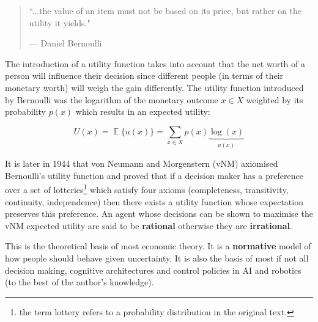 \begin{quote}
  \onehalfspacing%
  ``...the value of an item must not be based on its price, but rather on the utility it yields."\par\raggedleft--- \textup{Daniel Bernoulli}
\end{quote}

The introduction of a utility function takes into account that the net worth of a person will influence their decision since 
different people (in terms of their monetary worth) will weigh the gain differently. The utility function introduced by Bernoulli 
was the logarithm of the monetary outcome $x \in X$ weighted by its probability $p(x)$ which results in an expected utility: 

\begin{equation*}\label{eq:exp_utility}
  U(x) = \displaystyle \mathop{\mathbb{E}} \{ u(x) \} = \sum_{x\in X} p(x) \underbrace{\log(x)}_{u(x)}
\end{equation*}


It is later in 1944 that von Neumann and Morgenstern (vNM)\citep{VonNeumann1944} axiomised Bernoulli's utility function 
and proved that if a decision maker has a preference over a set of lotteries\footnote{the term lottery refers 
to a probability distribution in the original text.} which satisfy four axioms
(completeness, transitivity, continuity, independence) then there exists a utility function whose expectation 
preserves this preference. An agent whose decisions can be shown to maximise the vNM expected utility are said 
to be \textbf{rational} otherwise they are \textbf{irrational}.



This is the theoretical basis of most economic theory. It is a \textbf{normative} model of how people should behave given uncertainty. It is also the basis of most 
if not all decision making, cognitive architectures and control policies in AI and robotics (to the best of the author's knowledge).

